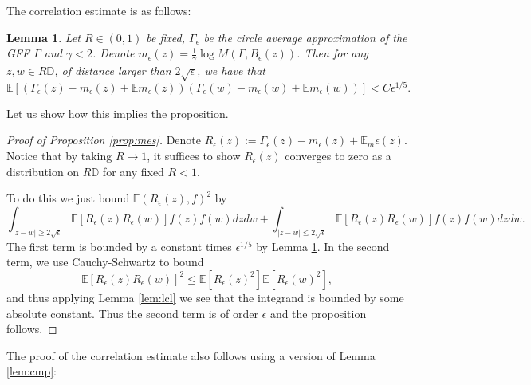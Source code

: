 \documentclass[11pt]{amsart}
\newtheorem{lemma}[thm]{Lemma}
\newcommand{\D}{\mathbb D}
\newcommand{\E}{\mathbb E}
\renewcommand{\1}{\mathbf 1}
\newcommand{\eps}{\epsilon}
\begin{document}
The correlation estimate is as follows:

\begin{lemma}\label{lem:cor}
Let $R \in (0,1)$ be fixed, $\Gamma_\eps$ be the circle average approximation of the GFF $\Gamma$ and $\gamma < 2$. Denote $m_\eps(z) = \frac{1}{\gamma} \log M(\Gamma, B_{\eps}(z))$. Then for any $z,w \in R\D$, of distance larger than $2\sqrt{\eps}$, we have that
$$\E\left[\left(\Gamma_\eps(z) - m_\eps(z) + \E m_\eps(z)\right)\left(\Gamma_\eps(w) - m_\eps(w) + \E m_\eps(w)\right)\right] < C\eps^{1/5}.$$
\end{lemma}

Let us show how this implies the proposition. 

\begin{proof}[Proof of Proposition \ref{prop:mes}]
Denote $R_\eps(z) := \Gamma_\eps(z) - m_\eps(z) + \E_m\eps(z)$. Notice that by taking $R \to 1$, it suffices to show $R_\eps(z)$ converges to zero as a distribution on $R\D$ for any fixed $R < 1$.
 
To do this we just bound $\E (R_\eps(z), f)^2$ by $$\int_{|z-w| \geq 2\sqrt{\eps}} \E\left[R_\eps(z) R_\eps(w)\right] f(z)f(w) dzdw + \int_{|z-w| \leq 2\sqrt{\eps}} \E\left[R_\eps(z)R_\eps(w)\right] f(z)f(w) dzdw.$$
The first term is bounded by a constant times $\eps^{1/5}$ by Lemma \ref{lem:cor}. In the second term, we use Cauchy-Schwartz to bound 
$$\E\left[R_\eps(z)R_\eps(w)\right]^2  \leq \E\left[R_\eps(z)^2\right]\E\left[R_\eps(w)^2\right],$$
and thus applying Lemma \ref{lem:lcl} we see that the integrand is bounded by some absolute constant. Thus the second term is of order $\eps$ and the proposition follows.
\end{proof}

The proof of the correlation estimate also follows using a version of Lemma \ref{lem:cmp}:
\end{document}
